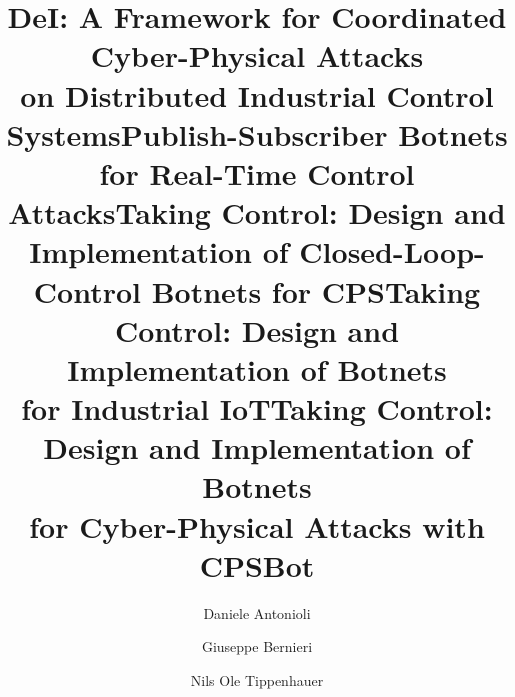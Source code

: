 \documentclass[sigconf]{acmart}
\makeatletter
\newcommand{\Botnet}{CPSBot\@\xspace}
\makeatother
\begin{document}
\title{ DeI: A Framework for Coordinated Cyber-Physical Attacks
\\on Distributed Industrial Control Systems}
\title{Publish-Subscriber Botnets for Real-Time Control Attacks}
\title{Taking Control: Design and Implementation of Closed-Loop-Control Botnets for CPS}
\title{Taking Control: Design and Implementation of Botnets\\ for Industrial
IoT}
\title{Taking Control: Design and Implementation of Botnets\\ for
Cyber-Physical Attacks with \Botnet}


\author{Daniele Antonioli}

\author{Giuseppe Bernieri}

\author{Nils Ole Tippenhauer}

\renewcommand{\shortauthors}{D. Antonioli et al.}
\end{document}

